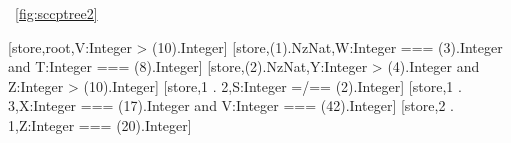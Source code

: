 ~\ref{fig:sccptree2}

\begin{maude}
{ [store,root,V:Integer > (10).Integer]
  [store,(1).NzNat,W:Integer === (3).Integer 
           and T:Integer === (8).Integer] 
  [store,(2).NzNat,Y:Integer > (4).Integer 
           and Z:Integer > (10).Integer] 
  [store,1 . 2,S:Integer =/== (2).Integer] 
  [store,1 . 3,X:Integer === (17).Integer 
           and V:Integer === (42).Integer] 
  [store,2 . 1,Z:Integer === (20).Integer] }
\end{maude}


